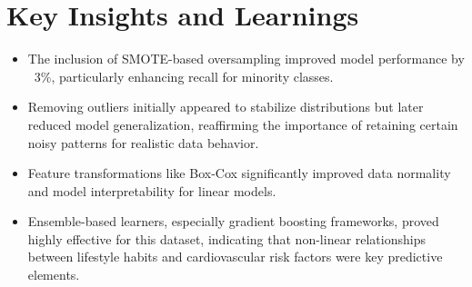 \section{Key Insights and Learnings}\label{sec:key-insights-and-learnings}

\begin{itemize}
    \item The inclusion of SMOTE-based oversampling improved model performance by ~3\%, particularly enhancing recall for minority classes.
    \item Removing outliers initially appeared to stabilize distributions but later reduced model generalization, reaffirming the importance of retaining certain noisy patterns for realistic data behavior.
    \item Feature transformations like Box-Cox significantly improved data normality and model interpretability for linear models.
    \item Ensemble-based learners, especially gradient boosting frameworks, proved highly effective for this dataset, indicating that non-linear relationships between lifestyle habits and cardiovascular risk factors were key predictive elements.
\end{itemize}

